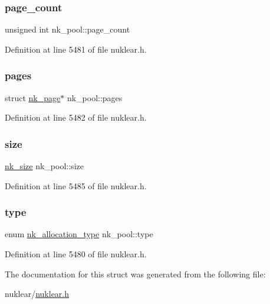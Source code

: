 \mbox{\label{structnk__pool_a36add32173cf3c647a13bf163a26384b}} 
\subsubsection{\texorpdfstring{page\+\_\+count}{page\_count}}
{\footnotesize\ttfamily unsigned int nk\+\_\+pool\+::page\+\_\+count}



Definition at line 5481 of file nuklear.\+h.

\mbox{\label{structnk__pool_ae85bca8b0974e60bdf2dfadc3587848f}} 
\subsubsection{\texorpdfstring{pages}{pages}}
{\footnotesize\ttfamily struct \mbox{\hyperlink{structnk__page}{nk\+\_\+page}}$\ast$ nk\+\_\+pool\+::pages}



Definition at line 5482 of file nuklear.\+h.

\mbox{\label{structnk__pool_a5995fa53f2098e079e47928e260120ac}} 
\subsubsection{\texorpdfstring{size}{size}}
{\footnotesize\ttfamily \mbox{\hyperlink{nuklear_8h_a84c0fc50dec5501be327b33d41d9010c}{nk\+\_\+size}} nk\+\_\+pool\+::size}



Definition at line 5485 of file nuklear.\+h.

\mbox{\label{structnk__pool_ae622d2f8662677712eb3644a8dd4008c}} 
\subsubsection{\texorpdfstring{type}{type}}
{\footnotesize\ttfamily enum \mbox{\hyperlink{nuklear_8h_aa988e58afebdfa0bbd380ed643f913ec}{nk\+\_\+allocation\+\_\+type}} nk\+\_\+pool\+::type}



Definition at line 5480 of file nuklear.\+h.



The documentation for this struct was generated from the following file\+:\begin{DoxyCompactItemize}
\item 
nuklear/\mbox{\hyperlink{nuklear_8h}{nuklear.\+h}}\end{DoxyCompactItemize}
